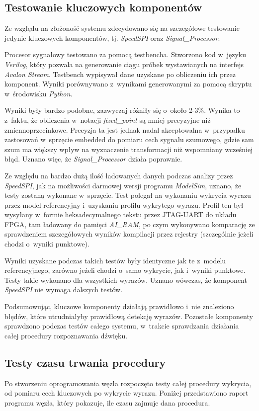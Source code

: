 \subsection{Testowanie kluczowych komponentów}

Ze względu na złożoność systemu zdecydowano się na szczegółowe testowanie jedynie kluczowych komponentów, tj. \textit{SpeedSPI} oraz \textit{Signal\_Processor}.

Procesor sygnałowy testowano za pomocą testbencha. Stworzono kod w~języku \textit{Verilog}, który pozwala na generowanie ciągu próbek wystawianych na interfejs \textit{Avalon Stream}. Testbench wypisywał dane uzyskane po obliczeniu ich przez komponent. Wyniki porównywano z~wynikami generowanymi za pomocą skryptu w~środowisku \textit{Python}.

Wyniki były bardzo podobne, zazwyczaj różniły się o~około 2-3\%. Wynika to z~faktu, że obliczenia w~notacji \textit{fixed\_point} są mniej precyzyjne niż zmiennoprzecinkowe. Precyzja ta jest jednak nadal akceptowalna w~przypadku zastosowań w~sprzęcie embedded do pomiaru cech sygnału szumowego, gdzie sam szum ma większy wpływ na wyznaczenie transformacji niż wspomniany wcześniej błąd. Uznano więc, że \textit{Signal\_Processor} działa poprawnie.

Ze względu na bardzo dużą ilość ładowanych danych podczas analizy przez \textit{SpeedSPI}, jak na możliwości darmowej wersji programu \textit{ModelSim}, uznano, że testy zostaną wykonane w~sprzęcie. Test polegał na wykonaniu wykrycia wyrazu przez model referencyjny i~uzyskaniu profilu wykrytego wyrazu. Profil ten był wysyłany w~formie heksadecymalnego tekstu przez JTAG-UART do układu FPGA, tam ładowany do pamięci \textit{AI\_RAM}, po czym wykonywano komparację ze sprawdzeniem szczegółowych wyników kompilacji przez rejestry (szczególnie jeżeli chodzi o~wyniki punktowe).

Wyniki uzyskane podczas takich testów były identyczne jak te z~modelu referencyjnego, zarówno jeżeli chodzi o~samo wykrycie, jak i~wyniki punktowe. Testy takie wykonano dla wszystkich wyrazów. Uznano wówczas, że komponent \textit{SpeedSPI} nie wymaga dalszych testów.

Podsumowując, kluczowe komponenty działają prawidłowo i~nie znaleziono błędów, które utrudniałyby prawidłową detekcję wyrazów. Pozostałe komponenty sprawdzono podczas testów całego systemu, w~trakcie sprawdzania działania całej procedury rozpoznawania dźwięku.

\subsection{Testy czasu trwania procedury}
Po stworzeniu oprogramowania węzła rozpoczęto testy całej procedury wykrycia, od pomiaru cech kluczowych po wykrycie wyrazu. Poniżej przedstawiono raport programu węzła, który pokazuje, ile czasu zajmuje dana procedura.

